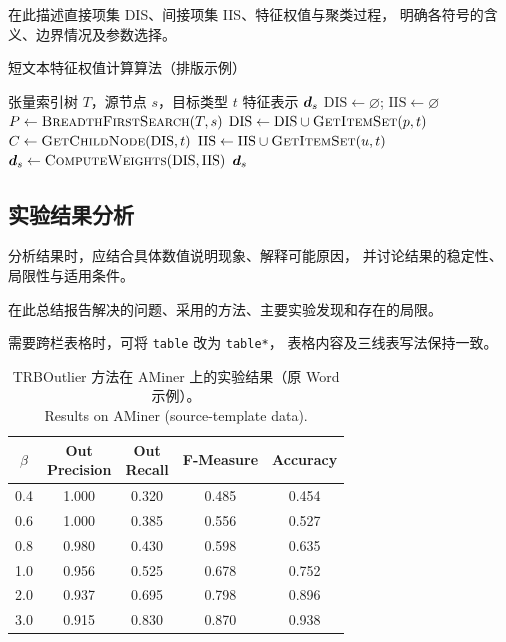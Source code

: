 \documentclass[sigconf,nonacm,screen]{acmart}
\begin{document}
在此描述直接项集 DIS、间接项集 IIS、特征权值与聚类过程，
明确各符号的含义、边界情况及参数选择。

\begin{algorithm}[tbp]
  \caption{短文本特征权值计算算法（排版示例）}
  \label{alg:features}
  \begin{algorithmic}[1]
    \Require 张量索引树 $T$，源节点 $s$，目标类型 $t$
    \Ensure 特征表示 $\bm{d}_s$
    \State $\mathrm{DIS}\gets\varnothing$;
      $\mathrm{IIS}\gets\varnothing$
    \State $P\gets\Call{BreadthFirstSearch}{T,s}$
      \State $\mathrm{DIS}\gets\mathrm{DIS}\cup\Call{GetItemSet}{p,t}$
    \EndFor
    \State $C\gets\Call{GetChildNode}{\mathrm{DIS},t}$
        \State $\mathrm{IIS}\gets\mathrm{IIS}\cup\Call{GetItemSet}{u,t}$
      \EndIf
    \EndFor
    \State $\vect{d}_s\gets\Call{ComputeWeights}{\mathrm{DIS},\mathrm{IIS}}$
    \State \Return $\bm{d}_s$
  \end{algorithmic}
\end{algorithm}

\subsection{实验结果分析}
\label{sec:task1-result}
分析结果时，应结合具体数值说明现象、解释可能原因，
并讨论结果的稳定性、局限性与适用条件。

在此总结报告解决的问题、采用的方法、主要实验发现和存在的局限。

需要跨栏表格时，可将 \texttt{table} 改为 \texttt{table*}，
表格内容及三线表写法保持一致。

\begin{table}[tbp]
  \caption{TRBOutlier 方法在 AMiner 上的实验结果（原 Word 示例）。\\Results on AMiner (source-template data).}
  \label{tab:aminer}
  \centering
  \setlength{\tabcolsep}{3.5pt}
  \begin{tabular}{ccccc}
    \toprule
    $\beta$ & \shortstack{Out\\Precision} & \shortstack{Out\\Recall}
      & F-Measure & Accuracy\\
    \midrule
    0.4 & 1.000 & 0.320 & 0.485 & 0.454\\
    0.6 & 1.000 & 0.385 & 0.556 & 0.527\\
    0.8 & 0.980 & 0.430 & 0.598 & 0.635\\
    1.0 & 0.956 & 0.525 & 0.678 & 0.752\\
    2.0 & 0.937 & 0.695 & 0.798 & 0.896\\
    3.0 & 0.915 & 0.830 & 0.870 & 0.938\\
    \bottomrule
  \end{tabular}
\end{table}
\end{document}
